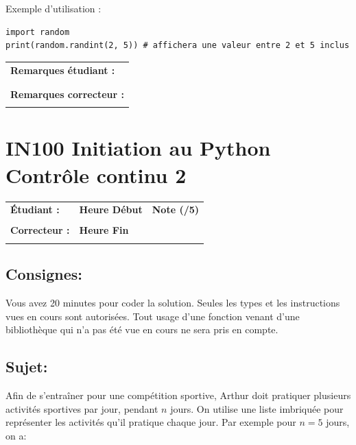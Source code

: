 \documentclass[a4paper,11pt]{article}
\begin{document}
Exemple d’utilisation :

\begin{verbatim}
import random
print(random.randint(2, 5)) # affichera une valeur entre 2 et 5 inclus
\end{verbatim}


\begin{table}[h!]
\centering
\renewcommand{\arraystretch}{1.4} %
\begin{tabular}{|p{15cm}|}
\hline
\textbf{Remarques étudiant :}    \\
 \\
 \\
\hline
\textbf{Remarques correcteur :}  \\
 \\
\hline
\end{tabular}
\end{table}


\newpage

\section*{\center IN100 Initiation au Python\\
Contrôle continu 2}


\begin{table}[h!]
\centering
\renewcommand{\arraystretch}{1.4} %
\begin{tabular}{|p{10cm}|p{3cm}|p{2cm}|}
\hline
\textbf{Étudiant :} & \textbf{Heure Début }  & \textbf{Note (/5) }  \\
& & \\
\hline
\textbf{Correcteur :} & \textbf{Heure Fin } & \\
& & \\
\hline

\hline
\end{tabular}
\end{table}

\subsection*{Consignes:} Vous avez 20 minutes pour coder la solution. Seules les types et les instructions vues en cours sont autorisées. Tout usage d'une fonction 
venant d'une bibliothèque qui n'a pas été vue en cours ne sera pris en compte. 



\subsection*{Sujet:}
Afin de s'entraîner pour une compétition sportive, Arthur doit pratiquer plusieurs activités sportives par jour, pendant $n$ jours. On utilise une liste imbriquée pour représenter 
les activités qu'il pratique chaque jour. Par exemple pour $n = 5$ jours, on
a:  
\end{document}
